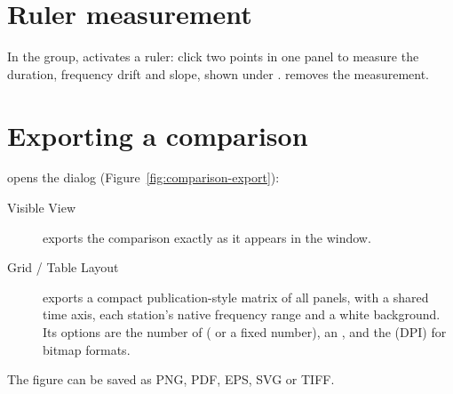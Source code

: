 \section{Ruler measurement}

In the  group,  activates a ruler: click two points in one
panel to measure the duration, frequency drift and slope, shown under .
 removes the measurement.

\section{Exporting a comparison}
\label{sec:comparison-export}

 opens the  dialog (Figure~\ref{fig:comparison-export}):
\begin{description}
  \item[Visible View] exports the comparison exactly as it appears in the window.
  \item[Grid / Table Layout] exports a compact publication-style matrix of all panels, with
    a shared time axis, each station's native frequency range and a white background. Its
    options are the number of  ( or a fixed number), an
    , and the  (DPI) for bitmap formats.
\end{description}
The figure can be saved as PNG, PDF, EPS, SVG or TIFF.

